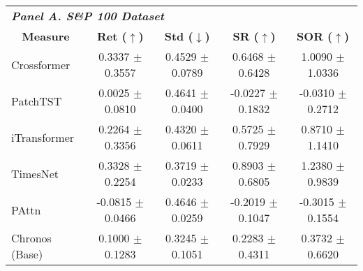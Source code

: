 \centering
{\fontsize{8pt}{11pt}\selectfont
\begin{tabular}{lcccc}
\hline
\multicolumn{5}{l}{\textit{\textbf{Panel A. S\&P 100 Dataset}}}                                                                                                                                                                                                                        \\ 
\multicolumn{1}{c}{\textbf{Measure}} & \textbf{Ret ($\uparrow$)}                                              & \textbf{Std ($\downarrow$)}                                   & \textbf{SR ($\uparrow$)}                          & \textbf{SOR ($\uparrow$)}                         \\ \hline
Crossformer                          & 0.3337 $\pm$ 0.3557                                                      & 0.4529 $\pm$ 0.0789                                             & 0.6468 $\pm$ 0.6428                                 & 1.0090 $\pm$ 1.0336                                 \\
PatchTST                             & 0.0025 $\pm$ 0.0810                                                      & 0.4641 $\pm$ 0.0400                                             & -0.0227 $\pm$ 0.1832                                & -0.0310 $\pm$ 0.2712                                \\
iTransformer                         & 0.2264 $\pm$ 0.3356                                                      & 0.4320 $\pm$ 0.0611                                             & 0.5725 $\pm$ 0.7929                                 & 0.8710 $\pm$ 1.1410                                 \\
TimesNet                             & 0.3328 $\pm$ 0.2254                                                      & 0.3719 $\pm$ 0.0233                                             & 0.8903 $\pm$ 0.6805                                 & 1.2380 $\pm$ 0.9839                                 \\
PAttn                                & -0.0815 $\pm$ 0.0466                                                     & 0.4646 $\pm$ 0.0259                                             & -0.2019 $\pm$ 0.1047                                & -0.3015 $\pm$ 0.1554                                \\
Chronos (Base)                       & 0.1000 $\pm$ 0.1283                                                      & 0.3245 $\pm$ 0.1051                                             & 0.2283 $\pm$ 0.4311                                 & 0.3732 $\pm$ 0.6620                                 \\

\end{tabular}}
